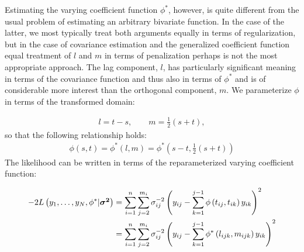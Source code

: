 \documentclass[12pt]{article}
\newcommand{\vsigmasq}{\mbox{\boldmath $\sigma^2$}}
\theoremstyle{definition}
\begin{document}
Estimating the varying coefficient function $\phi^*$, however, is quite different from the usual problem of estimating an arbitrary bivariate function. In the case of the latter, we most typically treat both arguments equally in terms of regularization, but in the case of covariance estimation and the generalized coefficient function equal treatment of $l$ and $m$ in terms of penalization perhaps is not the most appropriate approach. The lag component, $l$, has particularly significant meaning in terms of the covariance function and thus also in terms of $\phi^*$ and is of considerable more interest than the orthogonal component, $m$. We parameterize $\phi$ in terms of the transformed domain:

\begin{align*}
l = t-s, \qquad m = \frac{1}{2}\left(s+t\right),
\end{align*}
\noindent
so that the following relationship holds:
\begin{align*}
\phi\left(s,t\right) =\phi^*\left(l,m\right)= \phi^*\left(s-t, \frac{1}{2}\left(s+t\right)\right)
\end{align*}
\noindent
The likelihood can be written in terms of the reparameterized varying coefficient function:

\begin{align} 
\begin{split} \label{loglikelihood}
-2L\left(y_1,\dots,y_N ,\phi^* \vert \vsigmasq \right) &= \sum_{i=1}^n \sum_{j=2}^{m_i} \sigma_{ij}^{-2} \left(y_{ij} - \sum_{k=1}^{j-1}\phi\left({t_{ij},t_{ik}}\right)y_{ik} \right)^2 \\
&= \sum_{i=1}^n \sum_{j=2}^{m_i} \sigma_{ij}^{-2} \left(y_{ij} - \sum_{k=1}^{j-1}\phi^*\left({l_{ijk},m_{ijk}}\right)y_{ik} \right)^2 
\end{split} 
\end{align}
\end{document}

